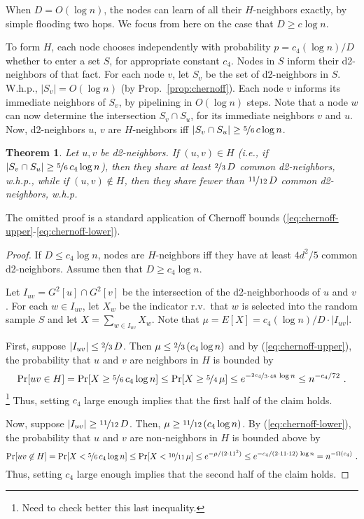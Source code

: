 \documentclass[12pt,a4]{article}
\newtheorem{theorem}{Theorem}[section]
\newcommand{\myfrac}[2]{\nicefrac{#1}{#2}\,}
\begin{document}
When $D = O(\log n)$, the nodes can learn of all their $H$-neighbors exactly, by simple flooding two hops. We focus from here on the case that $D \ge c\log n$.

To form $H$, each node chooses independently with probability $p = c_4(\log n)/D$ whether to enter a set $S$, for appropriate constant $c_4$. Nodes in $S$ inform their d2-neighbors of that fact. For each node $v$, let $S_v$ be the set of d2-neighbors in $S$. W.h.p., $|S_v| = O(\log n)$ (by Prop.~\ref{prop:chernoff}). Each node $v$ informs its immediate neighbors of $S_v$, by pipelining in $O(\log n)$ steps.
Note that a node $w$ can now determine the intersection $S_v \cap S_u$, for its immediate neighbors $v$ and $u$.
Now, d2-neighbors $u$, $v$ are $H$-neighbors iff $|S_v \cap S_u| \ge \myfrac{5}{6} c \log n$. 

\begin{theorem}
Let $u,v$ be d2-neighbors. 
If $(u,v) \in H$ (i.e., if $|S_v \cap S_u| \ge \myfrac{5}{6} c_4 \log n$), then they share at least $\nicefrac{2}{3}\, D$ common d2-neighbors, w.h.p.,
while if $(u,v) \not\in H$, then they share fewer than $\nicefrac{11}{12}\, D$ common d2-neighbors, w.h.p.
\label{thm:similarity}
\end{theorem}

The omitted proof is a standard application of Chernoff bounds (\ref{eq:chernoff-upper}-\ref{eq:chernoff-lower}).
{\small
\begin{proof}
If $D \le c_4\log n$, nodes are $H$-neighbors iff they have at least $4d^2/5$ common d2-neighbors. Assume then that $D \ge c_4\log n$.

Let $I_{uv} = G^2[u]\cap G^2[v]$ be the intersection of the d2-neighborhoods of $u$ and $v$. 
For each $w \in I_{uv}$, let $X_w$ be the indicator r.v.\ that $w$ is
selected into the random sample $S$ and let $X = \sum_{w \in I_{uv}} X_w$. Note that $\mu = E[X] = c_4 (\log n)/D \cdot |I_{uv}|$.

First, suppose $|I_{uv}| \le \nicefrac{2}{3}\, D$.
Then $\mu \le \nicefrac{2}{3}\, (c_4\log n)$ and
by (\ref{eq:chernoff-upper}), the probability that $u$ and $v$ are neighbors in $H$ is bounded by
  \[ \Pr[uv \in H] = \Pr[X \ge \nicefrac{5}{6}\, c_4 \log n]
\le \Pr[X \ge \nicefrac{5}{4}\,\mu] \le e^{-\nicefrac{2c_4}{3\cdot 48}\, \log n} \le n^{-c_4/72}\ . \]
\footnote{Need to check better this last inequality.} 
Thus, setting $c_4$ large enough implies that the first half of the claim holds.

Now, suppose $|I_{uv}| \ge \nicefrac{11}{12}\, D$.
Then, $\mu \ge \nicefrac{11}{12}\, (c_4\log n)$.
By (\ref{eq:chernoff-lower}), the probability that $u$ and $v$ are non-neighbors in $H$ is bounded above by
  \[ \Pr[uv \not\in H] = \Pr[X < \nicefrac{5}{6}\, c_4 \log n]
\le \Pr[X < \nicefrac{10}{11}\,\mu] \le e^{-\mu/(2\cdot 11^2)} \le e^{-c_4/(2\cdot 11 \cdot 12)\, \log n} = n^{-\Omega(c_4)}\ . \]
Thus, setting $c_4$ large enough implies that the second half of the claim holds.
\end{proof}
}
\end{document}
